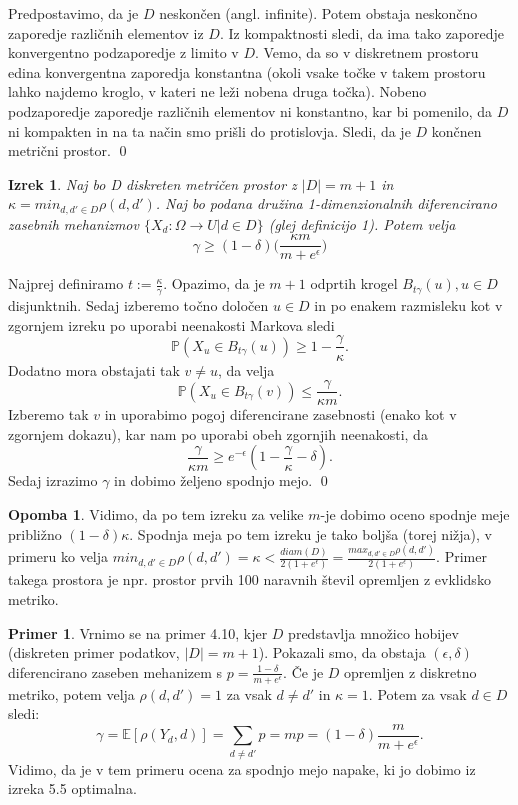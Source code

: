 \documentclass[12pt,a4paper]{amsart}
\theoremstyle{definition} %
\newtheorem{primer}[definicija]{Primer}
\newtheorem{opomba}[definicija]{Opomba}
\theoremstyle{plain} %
\newtheorem{izrek}[definicija]{Izrek}
\begin{document}
\proof
 Predpostavimo, da je $D$ neskončen (angl. infinite). Potem obstaja neskončno zaporedje različnih elementov iz $D$. Iz kompaktnosti sledi, da ima tako zaporedje konvergentno podzaporedje z limito v $D$. Vemo, da so v diskretnem prostoru edina konvergentna zaporedja konstantna (okoli vsake točke v takem prostoru lahko najdemo kroglo, v kateri ne leži nobena druga točka). Nobeno podzaporedje zaporedje različnih elementov ni konstantno, kar bi pomenilo, da $D$ ni kompakten in na ta način smo prišli do protislovja. Sledi, da je $D$ končnen metrični prostor.
\qed
\newline
\newline
\begin{izrek}
Naj bo D diskreten metričen prostor z $|D| = m + 1$ in $\kappa = min_{d,d' \in D}\rho(d,d')$.  Naj bo podana družina 1-dimenzionalnih diferencirano zasebnih mehanizmov $\{ X_d: \Omega \rightarrow U | d \in D\}$ (glej definicijo 1). Potem velja $$\gamma  \geq (1-\delta)\Big(\frac{\kappa m}{m+e^\epsilon}\Big)$$
\end{izrek}
\proof
Najprej definiramo $t := \frac{\kappa}{\gamma}$. Opazimo, da je $m + 1$ odprtih krogel $B_{t\gamma}(u), u \in D$ disjunktnih. Sedaj izberemo točno določen $u \in D$ in po enakem razmisleku kot v zgornjem izreku po uporabi neenakosti Markova sledi $$\mathbb{P}(X_u \in B_{t\gamma}(u)) \geq 1 - \frac{\gamma}{\kappa}.$$
Dodatno mora obstajati tak $v \neq u$, da velja $$\mathbb{P}(X_u \in B_{t\gamma}(v)) \leq \frac{\gamma}{\kappa m}.$$  Izberemo tak $v$ in uporabimo pogoj diferencirane zasebnosti (enako kot v zgornjem dokazu), kar nam po uporabi obeh zgornjih neenakosti, da $$\frac{\gamma}{\kappa m} \geq e^{-\epsilon}(1 - \frac{\gamma}{\kappa} - \delta). $$ Sedaj izrazimo $\gamma$ in dobimo željeno spodnjo mejo.
\qed
\begin{opomba}
Vidimo, da po tem izreku za velike $m$-je dobimo oceno spodnje meje približno $(1-\delta)\kappa$. Spodnja meja po tem izreku je tako boljša (torej nižja), v primeru ko velja $min_{d,d' \in D}\rho(d,d') = \kappa < \frac{diam(D)}{2(1+e^\epsilon)} =  \frac{max_{d,d' \in D}\rho(d,d')}{2(1+e^\epsilon)}$. Primer takega prostora je npr. prostor prvih 100 naravnih števil opremljen z evklidsko metriko.
\end{opomba}
\begin{primer}
Vrnimo se na primer 4.10, kjer $D$ predstavlja množico hobijev (diskreten primer podatkov, $|D|=m+1$). Pokazali smo, da obstaja $(\epsilon, \delta)$ diferencirano zaseben mehanizem s $p=\frac{1-\delta}{m+e^{\epsilon}}$. Če je $D$ opremljen z diskretno metriko, potem velja $\rho(d,d')=1$ za vsak $d \neq d'$ in $\kappa=1$. Potem za vsak $d \in D$ sledi:
$$\gamma = \mathbb{E}[\rho(Y_d,d)] = \sum_{d \neq d'}p=mp=(1-\delta)\frac{m}{m+e^{\epsilon}}.$$ Vidimo, da je v tem primeru ocena za spodnjo mejo napake, ki jo dobimo iz izreka 5.5 optimalna.
\end{primer}
\end{document}
